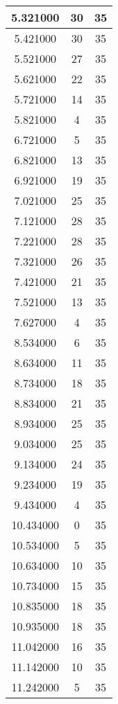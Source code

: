 \begin{longtable}[htbp]{|c|c|c|}
5.321000 & 30 & 35 \\ \hline
5.421000 & 30 & 35 \\ \hline
5.521000 & 27 & 35 \\ \hline
5.621000 & 22 & 35 \\ \hline
5.721000 & 14 & 35 \\ \hline
5.821000 & 4 & 35 \\ \hline
6.721000 & 5 & 35 \\ \hline
6.821000 & 13 & 35 \\ \hline
6.921000 & 19 & 35 \\ \hline
7.021000 & 25 & 35 \\ \hline
7.121000 & 28 & 35 \\ \hline
7.221000 & 28 & 35 \\ \hline
7.321000 & 26 & 35 \\ \hline
7.421000 & 21 & 35 \\ \hline
7.521000 & 13 & 35 \\ \hline
7.627000 & 4 & 35 \\ \hline
8.534000 & 6 & 35 \\ \hline
8.634000 & 11 & 35 \\ \hline
8.734000 & 18 & 35 \\ \hline
8.834000 & 21 & 35 \\ \hline
8.934000 & 25 & 35 \\ \hline
9.034000 & 25 & 35 \\ \hline
9.134000 & 24 & 35 \\ \hline
9.234000 & 19 & 35 \\ \hline
9.434000 & 4 & 35 \\ \hline
10.434000 & 0 & 35 \\ \hline
10.534000 & 5 & 35 \\ \hline
10.634000 & 10 & 35 \\ \hline
10.734000 & 15 & 35 \\ \hline
10.835000 & 18 & 35 \\ \hline
10.935000 & 18 & 35 \\ \hline
11.042000 & 16 & 35 \\ \hline
11.142000 & 10 & 35 \\ \hline
11.242000 & 5 & 35 \\ \hline
\end{longtable}
